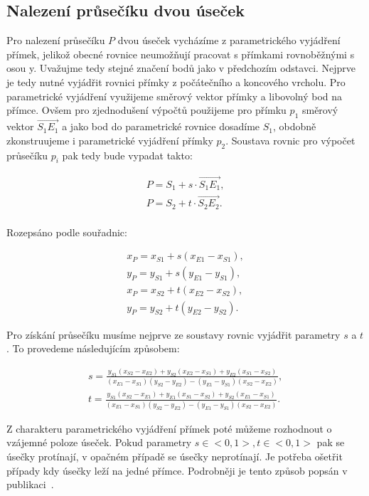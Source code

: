 \subsection{Nalezení průsečíku dvou úseček}
	Pro nalezení průsečíku $P$ dvou úseček vycházíme z parametrického vyjádření přímek, jelikož obecné rovnice neumožňují pracovat s přímkami rovnoběžnými s osou y. Uvažujme tedy stejné značení bodů jako v předchozím odstavci. Nejprve je tedy nutné vyjádřit rovnici přímky z počátečního a koncového vrcholu. Pro parametrické vyjádření využijeme směrový vektor přímky a libovolný bod na přímce. Ovšem pro zjednodušení výpočtů použijeme pro přímku $p_1$ směrový vektor $\overrightarrow{S_1E_1}$ a jako bod do parametrické rovnice dosadíme $S_1$, obdobně zkonstruujeme i parametrické vyjádření přímky $p_2$. Soustava rovnic pro výpočet průsečíku $p_i$ pak tedy bude vypadat takto:
	
\begin{align*} 
P = S_1 + s \cdot \overrightarrow{S_1E_1}, \\
P = S_2 + t \cdot \overrightarrow{S_2E_2}. \\
\end{align*}

Rozepsáno podle souřadnic:

\begin{align*} 
x_P = x_{S1} + s(x_{E1} - x_{S1}), \\
y_P = y_{S1} + s(y_{E1} - y_{S1}), \\
x_P = x_{S2} + t(x_{E2} - x_{S2}), \\
y_P = y_{S2} + t(y_{E2} - y_{S2}).
\end{align*}

Pro získání průsečíku musíme nejprve ze soustavy rovnic vyjádřit parametry $s$ a $t$. To provedeme následujícím způsobem:

\begin{align*} 
s = \frac{y_{S1}(x_{S2} - x_{E2}) + y_{S2}(x_{E2} - x_{S1}) + y_{E2}(x_{S1} - x_{S2})}{(x_{E1} - x_{S1}) (y_{S2} - y_{E2})   -   (y_{E1} - y_{S1}) (x_{S2} - x_{E2})}, \\
t = \frac{y_{S1}(x_{S2} - x_{E1}) + y_{E1}(x_{S1} - x_{S2}) + y_{S2}(x_{E1} - x_{S1})}{(x_{E1} - x_{S1}) (y_{S2} - y_{E2})   -   (y_{E1} - y_{S1}) (x_{S2} - x_{E2})}.
\end{align*}


Z charakteru parametrického vyjádření přímek poté můžeme rozhodnout o vzájemné poloze úseček. Pokud parametry $s \in <0,1>, t \in <0,1>$ pak se úsečky protínají, v opačném případě se úsečky neprotínají. Je potřeba ošetřit případy kdy úsečky leží na jedné přímce. Podrobněji je tento způsob popsán v publikaci~\cite{bayer2008algoritmy}.



